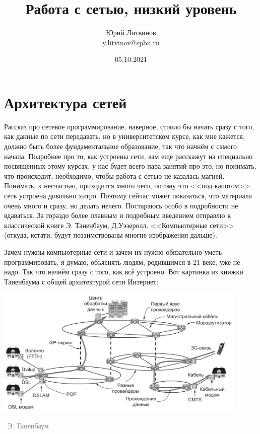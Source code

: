 \documentclass[a5paper]{article}
\title{Работа с сетью, низкий уровень}
\author{Юрий Литвинов\\\small{y.litvinov@spbu.ru}}
\date{05.10.2021}
\newcommand{\attribution}[1] {
\vspace{-5mm}\begin{flushright}\begin{scriptsize}\textcolor{gray}{\textcopyright\, #1}\end{scriptsize}\end{flushright}
}
\begin{document}
\maketitle
\thispagestyle{empty}

\section{Архитектура сетей}

Рассказ про сетевое программирование, наверное, стоило бы начать сразу с того, как данные по сети передавать, но в университетском курсе, как мне кажется, должно быть более фундаментальное образование, так что начнём с самого начала. Подробнее про то, как устроены сети, вам ещё расскажут на специально посвящённых этому курсах, у нас будет всего пара занятий про это, но понимать, что происходит, необходимо, чтобы работа с сетью не казалась магией. Понимать, к несчастью, приходится много чего, потому что <<под капотом>> сеть устроена довольно хитро. Поэтому сейчас может показаться, что материала очень много и сразу, но делать нечего. Постараюсь особо в подробности не вдаваться. За гораздо более плавным и подробным введением отправлю к классической книге Э. Таненбаум, Д.Уэзеролл. <<Компьютерные сети>> (откуда, кстати, будут позаимствованы многие изображения дальше).

Зачем нужны компьютерные сети и зачем их нужно обязательно уметь программировать, я думаю, объяснять людям, родившимся в 21 веке, уже не надо. Так что начнём сразу с того, как всё устроено. Вот картинка из книжки Таненбаума с общей архитектурой сети Интернет:
\begin{center}
    \includegraphics[width=0.9\textwidth]{internetArchitecture.png}
    \attribution{Э. Таненбаум}
\end{center}
\end{document}
